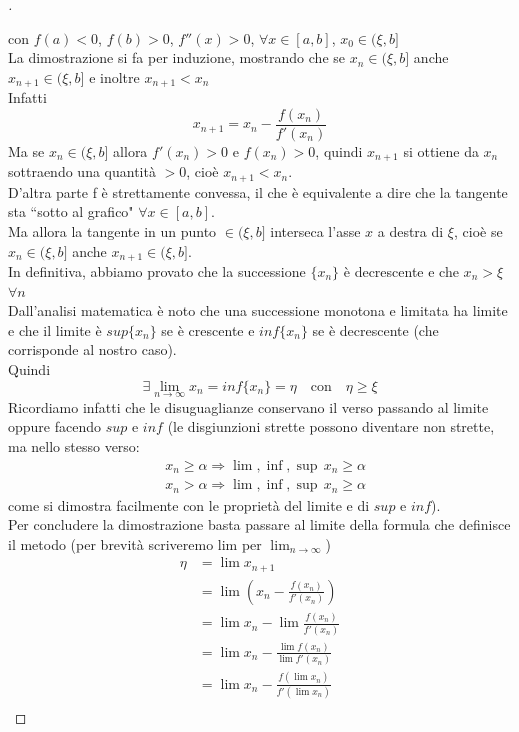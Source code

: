 \documentclass[12pt]{article}
\begin{document}
\begin{proof}[\unskip\nopunct]
\begin{center}
\end{center}
con $f(a) < 0$, $f(b) > 0$, $f''(x) > 0$, $\forall x \in [a,b]$, $x_0 \in (\xi,b]$\\
La dimostrazione si fa per induzione, mostrando che se $x_n \in (\xi, b]$ anche $x_{n+1} \in (\xi, b]$ e inoltre $x_{n+1} < x_n$ \\
Infatti \[x_{n+1} = x_n - \frac{f(x_n)}{f'(x_n)}\]
Ma se $x_n \in (\xi, b]$ allora $f'(x_n) > 0$ e $f(x_n) > 0$, quindi $x_{n+1}$ si ottiene da $x_n$ sottraendo una quantità $> 0$, cioè $x_{n+1} < x_n$.\\
D'altra parte f è strettamente convessa, il che è equivalente a dire che la tangente sta ``sotto al grafico" $\forall x \in [a,b]$.\\ 
Ma allora la tangente in un punto $\in (\xi, b]$ interseca l'asse $x$ a destra di $\xi$, cioè se $x_n \in (\xi, b]$ anche $x_{n+1} \in (\xi, b]$.\\
In definitiva, abbiamo provato che la successione $\{x_n\}$ è decrescente e che $x_n > \xi$ $\forall n$\\
Dall'analisi matematica è noto che una successione monotona e limitata ha limite e che il limite è $sup\{x_n\}$ se è crescente e $inf\{x_n\}$ se è decrescente (che corrisponde al nostro caso). \\
Quindi 
\[\exists \lim_{n \to \infty} x_n = inf\{x_n\} = \eta \quad \text{con} \quad \eta \geq \xi\]
Ricordiamo infatti che le disuguaglianze conservano il verso passando al limite oppure facendo $sup$ e $inf$ (le disgiunzioni strette possono diventare non strette, ma nello stesso verso:
\[ \begin{split}
	& x_n \geq \alpha \Rightarrow \lim, \inf, \sup \,x_n \geq \alpha \\ 
	& x_n > \alpha \Rightarrow \lim, \inf, \sup \,x_n \geq \alpha
\end{split} \]
come si dimostra facilmente con le proprietà del limite e di $sup$ e $inf$).\\
Per concludere la dimostrazione basta passare al limite della formula che definisce il metodo (per brevità scriveremo lim per $ \lim_{n \to \infty} $)
\[ \begin{split}
	\eta & = \lim x_{n+1} \\
	& = \lim \left( x_n - \frac{f(x_n)}{f'(x_n)} \right) \\
	& = \lim x_n - \lim\frac{f(x_n)}{f'(x_n)} \\
	& = \lim x_n - \frac{\lim f(x_n)}{\lim f'(x_n)} \\ 
	& = \lim x_n - \frac{f(\lim x_n)}{f'(\lim x_n)} \\

\end{split}\]
\end{proof}
\end{document}
